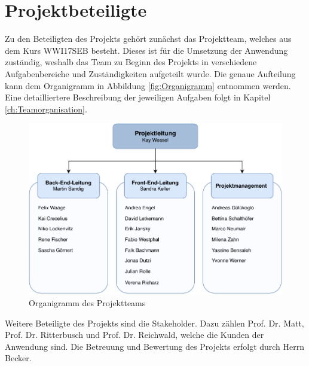 \section{Projektbeteiligte}
Zu den Beteiligten des Projekts gehört zunächst das Projektteam, welches aus dem Kurs WWI17SEB besteht.
Dieses ist für die Umsetzung der Anwendung zuständig, weshalb das Team zu Beginn des Projekts in verschiedene Aufgabenbereiche und Zuständigkeiten aufgeteilt wurde.
Die genaue Aufteilung kann dem Organigramm in Abbildung \vref{fig:Organigramm} entnommen werden.
Eine detailliertere Beschreibung der jeweiligen Aufgaben folgt in Kapitel \vref{ch:Teamorganisation}. 

\begin{figure}[h]
	\centering 
	\includegraphics[width=12cm]{img/Organigramm.pdf}
	\captionsetup{format=hang}
	\caption[Organigramm des Projektteams]{\label{fig:Organigramm}Organigramm des Projektteams}
\end{figure}

Weitere Beteiligte des Projekts sind die Stakeholder.
Dazu zählen Prof. Dr. Matt, Prof. Dr. Ritterbusch und Prof. Dr. Reichwald, welche die Kunden der Anwendung sind.
Die Betreuung und Bewertung des Projekts erfolgt durch Herrn Becker.



 